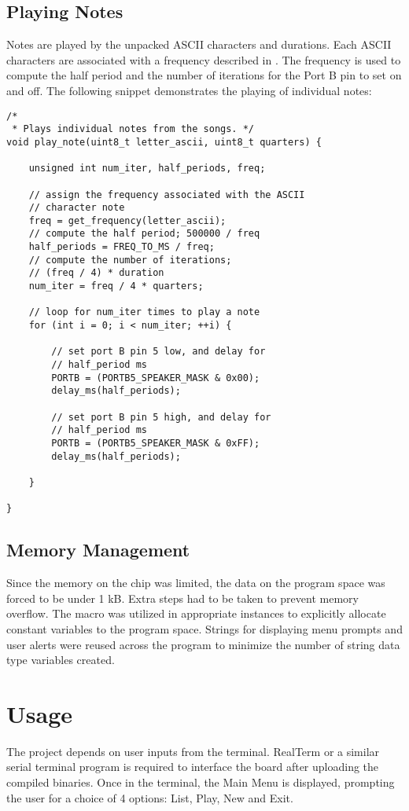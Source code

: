 \documentclass[usletter, 12pt]{article}
\begin{document}
        \subsection{Playing Notes}
        Notes are played by the unpacked ASCII characters and durations. Each ASCII characters are associated with a frequency described in . The frequency is used to compute the half period and the number of iterations for the Port B pin to set on and off. The following snippet demonstrates the playing of individual notes:

\begin{lstlisting}
/*
 * Plays individual notes from the songs. */
void play_note(uint8_t letter_ascii, uint8_t quarters) {

    unsigned int num_iter, half_periods, freq;

    // assign the frequency associated with the ASCII
    // character note
    freq = get_frequency(letter_ascii);
    // compute the half period; 500000 / freq
    half_periods = FREQ_TO_MS / freq;
    // compute the number of iterations;
    // (freq / 4) * duration
    num_iter = freq / 4 * quarters;

    // loop for num_iter times to play a note
    for (int i = 0; i < num_iter; ++i) {

        // set port B pin 5 low, and delay for
        // half_period ms
        PORTB = (PORTB5_SPEAKER_MASK & 0x00);
        delay_ms(half_periods);

        // set port B pin 5 high, and delay for
        // half_period ms
        PORTB = (PORTB5_SPEAKER_MASK & 0xFF);
        delay_ms(half_periods);

    }

}
\end{lstlisting}

        \subsection{Memory Management}
        Since the memory on the chip was limited, the data on the program space was forced to be under 1 kB. Extra steps had to be taken to prevent memory overflow. The  macro was utilized in appropriate instances to explicitly allocate constant variables to the program space. Strings for displaying menu prompts and user alerts were reused across the program to minimize the number of string data type variables created.

    \section{Usage}
    The project depends on user inputs from the terminal. RealTerm or a similar serial terminal program is required to interface the board after uploading the compiled binaries. Once in the terminal, the Main Menu is displayed, prompting the user for a choice of 4 options: List, Play, New and Exit.
\end{document}

